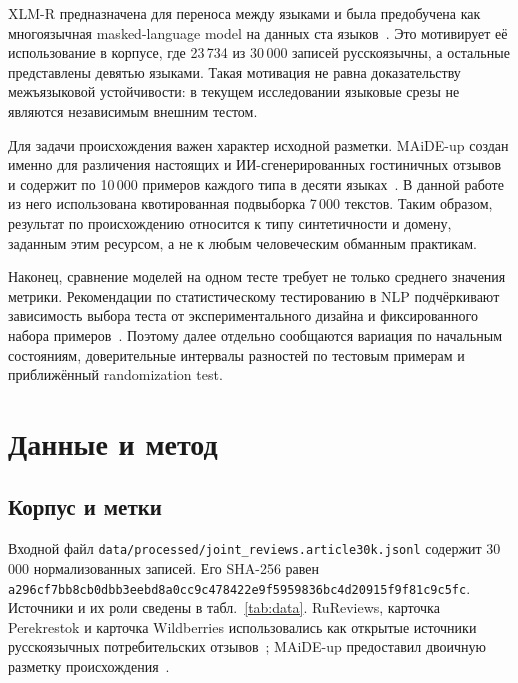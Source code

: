 \documentclass[11pt,a4paper]{article}
\newcommand{\repo}[1]{\nolinkurl{#1}}
\begin{document}
XLM-R предназначена для переноса между языками и была предобучена как многоязычная masked-language model на данных ста языков~\cite{conneau2020xlmr}. Это мотивирует её использование в корпусе, где 23\,734 из 30\,000 записей русскоязычны, а остальные представлены девятью языками. Такая мотивация не равна доказательству межъязыковой устойчивости: в текущем исследовании языковые срезы не являются независимым внешним тестом.

Для задачи происхождения важен характер исходной разметки. MAiDE-up создан именно для различения настоящих и ИИ-сгенерированных гостиничных отзывов и содержит по 10\,000 примеров каждого типа в десяти языках~\cite{ignat2025maide}. В данной работе из него использована квотированная подвыборка 7\,000 текстов. Таким образом, результат по происхождению относится к типу синтетичности и домену, заданным этим ресурсом, а не к любым человеческим обманным практикам.

Наконец, сравнение моделей на одном тесте требует не только среднего значения метрики. Рекомендации по статистическому тестированию в NLP подчёркивают зависимость выбора теста от экспериментального дизайна и фиксированного набора примеров~\cite{dror2018hitchhiker}. Поэтому далее отдельно сообщаются вариация по начальным состояниям, доверительные интервалы разностей по тестовым примерам и приближённый randomization test.

\section{Данные и метод}

\subsection{Корпус и метки}

Входной файл \repo{data/processed/joint\_reviews.article30k.jsonl} содержит 30\,000 нормализованных записей. Его SHA-256 равен \repo{a296cf7bb8cb0dbb3eebd8a0cc9c478422e9f5959836bc4d20915f9f81c9c5fc}. Источники и их роли сведены в табл.~\ref{tab:data}. RuReviews, карточка Perekrestok и карточка Wildberries использовались как открытые источники русскоязычных потребительских отзывов~\cite{rureviews,perekrestok,wildberries}; MAiDE-up предоставил двоичную разметку происхождения~\cite{ignat2025maide}.
\end{document}
